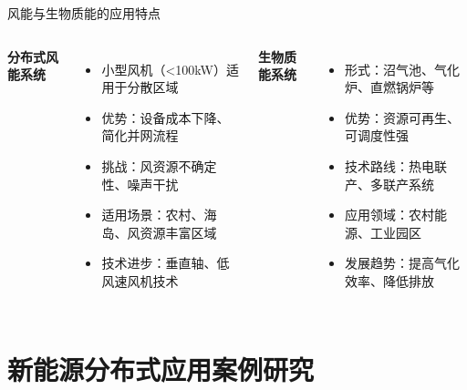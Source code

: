 \documentclass[aspectratio=169]{beamer}
\begin{document}
\begin{frame}{风能与生物质能的应用特点}
  \begin{columns}
    \textbf{分布式风能系统}
    \begin{itemize}
      \item 小型风机（<100kW）适用于分散区域
      \item 优势：设备成本下降、简化并网流程
      \item 挑战：风资源不确定性、噪声干扰
      \item 适用场景：农村、海岛、风资源丰富区域
      \item 技术进步：垂直轴、低风速风机技术\cite{Li2023}
    \end{itemize}
    \textbf{生物质能系统}
    \begin{itemize}
      \item 形式：沼气池、气化炉、直燃锅炉等
      \item 优势：资源可再生、可调度性强
      \item 技术路线：热电联产、多联产系统
      \item 应用领域：农村能源、工业园区
      \item 发展趋势：提高气化效率、降低排放\cite{Zhang2021}
    \end{itemize}
  \end{columns}
\end{frame}

\section{新能源分布式应用案例研究}
\end{document}
